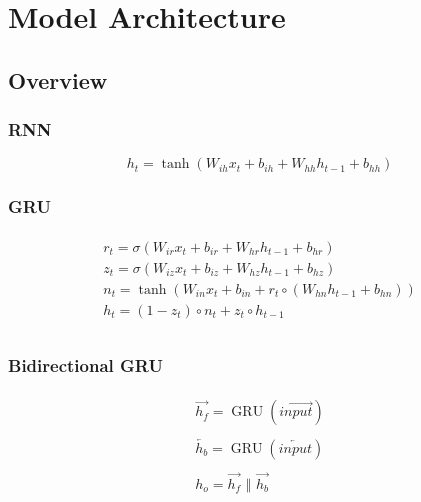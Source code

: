 \documentclass[twoside,twocolumn]{article}
\begin{document}
\section{Model Architecture}
\label{sec:models}
\subsection{Overview}
\subsubsection{RNN}
\begin{equation}
  \label{eq:rnn}
  h_t = \tanh(W_{ih} x_t + b_{ih}  +  W_{hh} h_{t-1} + b_{hh})
\end{equation}
\subsubsection{GRU}
\begin{equation}
  \label{eq:gru}
  \begin{split}\begin{array}{ll}
    r_t = \sigma(W_{ir} x_t + b_{ir} + W_{hr} h_{t-1} + b_{hr}) \\
    z_t = \sigma(W_{iz} x_t + b_{iz} + W_{hz} h_{t-1} + b_{hz}) \\
    n_t = \tanh(W_{in} x_t + b_{in} + r_t \circ (W_{hn} h_{t-1}+ b_{hn})) \\
    h_t = (1 - z_t) \circ n_t + z_t \circ h_{t-1} \\
  \end{array}\end{split}
\end{equation}
\subsubsection{Bidirectional GRU}
\begin{equation}
  \label{eq:bidirectional}
  \begin{split}
    \begin{array}{ll}
      \overrightarrow{h_f} = \operatorname{GRU}(\overrightarrow{input})\\
      \\
      \overleftarrow{h_b} = \operatorname{GRU}(\overleftarrow{input})\\
      \\
      h_o = \overrightarrow{h_f} \,\,\Vert \,\, \overrightarrow{h_b}\\
    \end{array}
  \end{split}
\end{equation}
\end{document}
